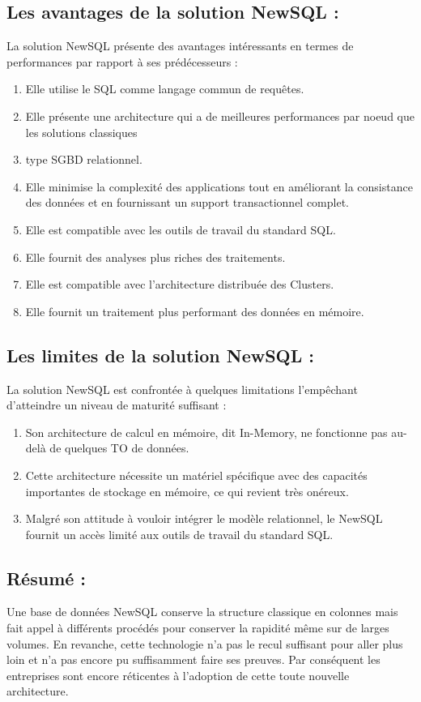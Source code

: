 \subsection{Les avantages de la solution NewSQL :}
La solution NewSQL présente des avantages intéressants en termes de performances par rapport à ses prédécesseurs : 
\begin{enumerate}
\item Elle utilise le SQL comme langage commun de requêtes. 
\item Elle présente une architecture qui a de meilleures performances par noeud que les solutions classiques \item type SGBD relationnel. 
\item Elle minimise la complexité des applications tout en améliorant la consistance des données et en fournissant un support transactionnel complet. 
\item Elle est compatible avec les outils de travail du standard SQL. 
\item Elle fournit des analyses plus riches des traitements. 
\item Elle est compatible avec l’architecture distribuée des Clusters. 
\item Elle fournit un traitement plus performant des données en mémoire. 
\end{enumerate}

\newpage
\subsection{Les limites de la solution NewSQL :}
La solution NewSQL est confrontée à quelques limitations l’empêchant d’atteindre un niveau de maturité suffisant :
\begin{enumerate}
\item Son architecture de calcul en mémoire, dit In-Memory, ne fonctionne pas au-delà de quelques TO de données.
\item Cette architecture nécessite un matériel spécifique avec des capacités importantes de stockage en mémoire, ce qui revient très onéreux.
\item Malgré son attitude à vouloir intégrer le modèle relationnel, le NewSQL fournit un accès limité aux outils de travail du standard SQL.
\end{enumerate}

\subsection{Résumé :}
Une base de données NewSQL conserve la structure classique en colonnes mais fait appel à différents procédés pour conserver la rapidité même sur de larges volumes. En revanche, cette technologie n’a pas le recul suffisant pour aller plus loin et n'a pas encore pu suffisamment faire ses preuves. Par conséquent les entreprises sont encore réticentes à l'adoption de cette toute nouvelle architecture.

